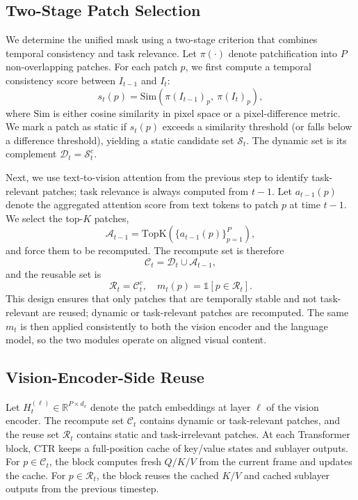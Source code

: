 \documentclass[11pt]{article}
\begin{document}
\subsection{Two-Stage Patch Selection}
We determine the unified mask using a two-stage criterion that combines temporal consistency and task relevance. Let $\pi(\cdot)$ denote patchification into $P$ non-overlapping patches. For each patch $p$, we first compute a temporal consistency score between $I_{t-1}$ and $I_t$:
\begin{equation}
    s_t(p) = \mathrm{Sim}\!\left(\pi(I_{t-1})_p,\ \pi(I_t)_p\right),
    \label{eq:temporal_sim}
\end{equation}
where $\mathrm{Sim}$ is either cosine similarity in pixel space or a pixel-difference metric. We mark a patch as static if $s_t(p)$ exceeds a similarity threshold (or falls below a difference threshold), yielding a static candidate set $\mathcal{S}_t$. The dynamic set is its complement $\mathcal{D}_t = \mathcal{S}_t^{c}$.

Next, we use text-to-vision attention from the previous step to identify task-relevant patches; task relevance is always computed from $t-1$. Let $a_{t-1}(p)$ denote the aggregated attention score from text tokens to patch $p$ at time $t-1$. We select the top-$K$ patches,
\begin{equation}
    \mathcal{A}_{t-1} = \mathrm{TopK}\!\left(\{a_{t-1}(p)\}_{p=1}^{P}\right),
    \label{eq:attn_topk}
\end{equation}
and force them to be recomputed. The recompute set is therefore
\begin{equation}
    \mathcal{C}_t = \mathcal{D}_t \cup \mathcal{A}_{t-1},
    \label{eq:recompute_set}
\end{equation}
and the reusable set is
\begin{equation}
    \mathcal{R}_t = \mathcal{C}_t^{c},\quad m_t(p)=\mathbb{1}[p \in \mathcal{R}_t].
    \label{eq:reuse_mask}
\end{equation}
This design ensures that only patches that are temporally stable and not task-relevant are reused; dynamic or task-relevant patches are recomputed. The same $m_t$ is then applied consistently to both the vision encoder and the language model, so the two modules operate on aligned visual content.

\subsection{Vision-Encoder-Side Reuse}
Let $H_t^{(\ell)} \in \mathbb{R}^{P \times d_v}$ denote the patch embeddings at layer $\ell$ of the vision encoder. The recompute set $\mathcal{C}_t$ contains dynamic or task-relevant patches, and the reuse set $\mathcal{R}_t$ contains static and task-irrelevant patches. At each Transformer block, CTR keeps a full-position cache of key/value states and sublayer outputs. For $p \in \mathcal{C}_t$, the block computes fresh $Q/K/V$ from the current frame and updates the cache. For $p \in \mathcal{R}_t$, the block reuses the cached $K/V$ and cached sublayer outputs from the previous timestep.
\end{document}
